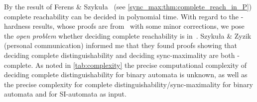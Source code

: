
By the result of Ferens \& Szyku\l a~\cite{DBLP:conf/icalp/FerensS23} (see \cref{sync_max:thm:complete_reach_in_P})
complete reachability
can be decided in polynomial time.
With regard to the \NL-hardness results,
whose proofs are from~\cite{DBLP:conf/dlt/Hoffmann23}
with some minor corrections, we pose the \emph{open problem} whether
deciding complete reachability is in~\NL.
Szyku\l a \& Zyzik~\cite{SzykulaZyzik24} (personal communication)
informed me that they found proofs showing that
deciding complete distinguishability
and deciding sync-maximality are both \PSPACE-complete.
As noted in \cref{tab:complexity} the precise computational complexity
of deciding complete distinguishability for binary automata
is unknown, as well as the precise complexity for complete distinguishability/sync-maximality
for binary automata and for SI-automata as input.






